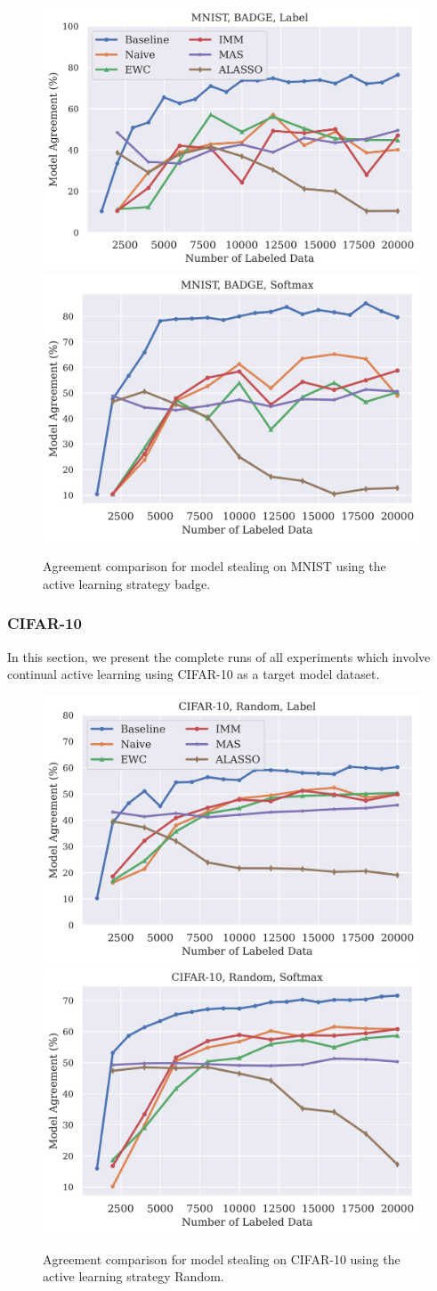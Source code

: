 \begin{figure}[!htb]
    \centering
    \includegraphics[width=0.48\linewidth]{images/results_CALMS/mnist_label_badge.png} \hfill
    \includegraphics[width=0.48\linewidth]{images/results_CALMS/mnist_softmax_badge.png}
    \caption{Agreement comparison for model stealing on MNIST using the active learning strategy \gls{badge}.}
    \label{fig:CALMSMNISTBadge}
\end{figure}

\clearpage

\subsubsection{CIFAR-10}
\label{sec:Appendix:CALMS:CIFAR}
In this section, we present the complete runs of all experiments which involve continual active learning using CIFAR-10 as a target model dataset.

\begin{figure}[!htb]
    \centering
    \includegraphics[width=0.48\linewidth]{images/results_CALMS/cifar_label_random.png} \hfill
    \includegraphics[width=0.48\linewidth]{images/results_CALMS/cifar_softmax_random.png}
    \caption{Agreement comparison for model stealing on CIFAR-10 using the active learning strategy Random.}
    \label{fig:CALMSCIFAR10Random}
\end{figure}


